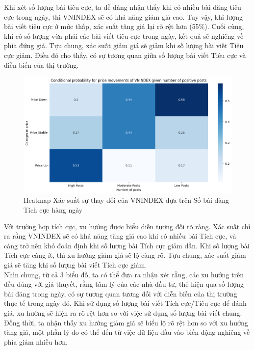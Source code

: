 Khi xét số lượng bài tiêu cực, ta dễ dàng nhận thấy khi có nhiều bài đăng tiêu cực trong ngày, thì VNINDEX sẽ có khả năng giảm giá cao. Tuy vậy, khi lượng bài viết tiêu cực ở mức thấp, xác suất tăng giá lại rõ rệt hơn (55\%). Cuối cùng, khi có số lượng vừa phải các bài viết tiêu cực trong ngày, kết quả sẽ nghiêng về phía đứng giá. Tựu chung, xác suất giảm giá sẽ giảm khi số lượng bài viết Tiêu cực giảm. Điều đó cho thấy, có sự tương quan giữa số lượng bài viết Tiêu cực và diễn biến của thị trường.

\begin{figure}[H]
    \centering
    \includegraphics[width=0.9\linewidth]{images/plot-5.3-hmvnipos.png}
    \caption{Heatmap Xác suất sự thay đổi của VNINDEX dựa trên Số bài đăng Tích cực hàng ngày}
    \label{fig:5.3}
\end{figure}

Với trường hợp tích cực, xu hướng được biểu diễn tương đối rõ ràng. Xác suất chỉ ra rằng VNINDEX sẽ có khả năng tăng giá cao khi có nhiều bài Tích cực, và càng trở nên khó đoán định khi số lượng bài Tích cực giảm dần. Khi số lượng bài Tích cực càng ít, thì xu hướng giảm giá sẽ lộ càng rõ. Tựu chung, xác suất giảm giá sẽ tăng khi số lượng bài viết Tích cực giảm.\\

Nhìn chung, từ cả 3 biểu đồ, ta có thể đưa ra nhận xét rằng, các xu hướng trên đều đúng với giả thuyết, rằng tâm lý của các nhà đầu tư, thể hiện qua số lượng bài đăng trong ngày, có sự tương quan tương đối với diễn biến của thị trường thực tế trong ngày đó. Khi sử dụng số lượng bài viết Tích cực/Tiêu cực để đánh giá, xu hướng sẽ hiện ra rõ rệt hơn so với việc sử dụng số lượng bài viết chung. Đồng thời, ta nhận thấy xu hướng giảm giá sẽ biểu lộ rõ rệt hơn so với xu hướng tăng giá, một phần lý do có thể đến từ việc dữ liệu đầu vào biến động nghiêng về phía giảm nhiều hơn.

